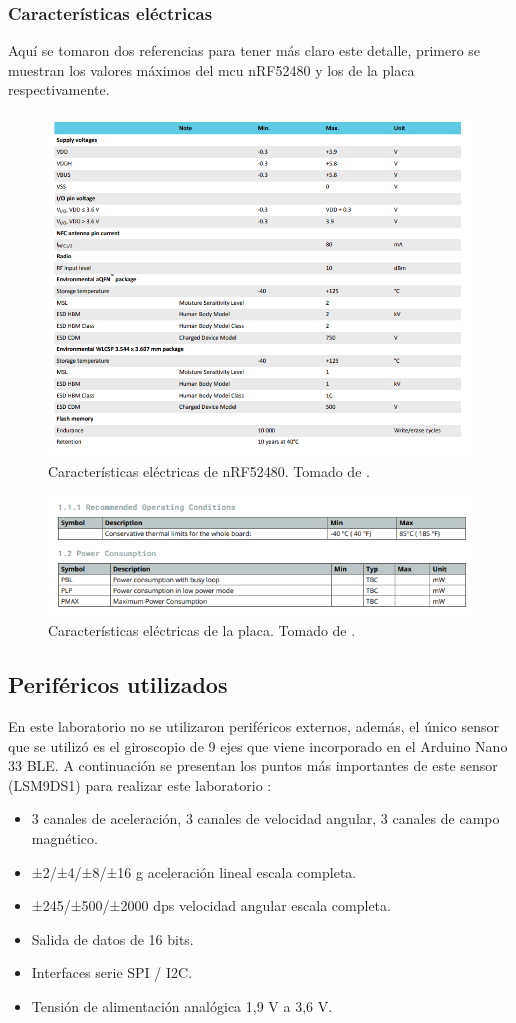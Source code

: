 \subsubsection*{Características eléctricas}
Aquí se tomaron dos referencias para tener más claro este detalle,  primero se muestran los valores máximos del mcu nRF52480 y los de la placa respectivamente.
\begin{figure}[H]
\centering
\includegraphics[width=.55\linewidth]{Imagenes/3.png}
 \caption{Características eléctricas de nRF52480. Tomado de \cite{web}.}
 \label{fig3}
 
\end{figure}
\begin{figure}[H]
\centering
\includegraphics[width=.55\linewidth]{Imagenes/3.1.png}
 \caption{ Características eléctricas de la placa. Tomado de \cite{web2}.}
 \label{fig3.1}
\end{figure}


\subsection*{Periféricos utilizados}
En este laboratorio no se utilizaron periféricos externos, además, el único sensor que se utilizó es el giroscopio de 9 ejes que viene incorporado en el Arduino Nano 33 BLE. A continuación se presentan los puntos más importantes de este sensor (LSM9DS1) para realizar este laboratorio \cite{giroscopio}:
\begin{itemize}
    \item 3 canales de aceleración, 3 canales de velocidad angular, 3 canales de campo magnético.
    \item ±2/±4/±8/±16 g aceleración lineal escala completa.
    \item ±245/±500/±2000 dps velocidad angular escala completa.
    \item Salida de datos de 16 bits.
    \item Interfaces serie SPI / I2C.
    \item Tensión de alimentación analógica 1,9 V a 3,6 V.
\end{itemize}

